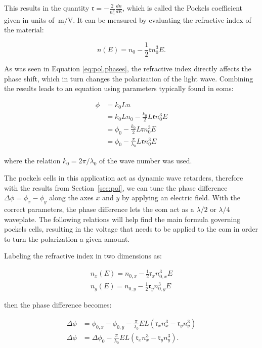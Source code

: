 This results in the quantity $\mathfrak{r} = -\frac{2}{n_0^3} \frac{dn}{dE}$, which is called the Pockels coefficient given in units of $\SI{}{\meter\per\volt}$. It can be measured by evaluating the refractive index of the material:

\begin{equation}
	n(E) = n_0 - \frac{1}{2} \mathfrak{r} n_0^3 E .
\end{equation}

As was seen in Equation \ref{eq:pol,phases}, the refractive index directly affects the phase shift, which in turn changes the polarization of the light wave. Combining the results leads to an equation using parameters typically found in \acp{eom}:

\begin{align}
	\phi & = k_0 L n \\
		 & = k_0 L n_0 - \frac{k_0}{2} L \mathfrak{r} n_0^3 E \\
		 & = \phi_0 - \frac{k_0}{2} L \mathfrak{r} n_0^3 E \\
		 & = \phi_0 - \frac{\pi}{\lambda_0} L \mathfrak{r} n_0^3 E
\end{align}

where the relation $k_0 = 2 \pi / \lambda_0$ of the wave number was used.

The pockels cells in this application act as dynamic wave retarders, therefore with the results from Section~\ref{sec:pol}, we can tune the phase difference $\Delta \phi = \phi_x - \phi_y$ along the axes $x$ and $y$ by applying an electric field. With the correct parameters, the phase difference lets the \ac{eom} act as a $\lambda / 2$ or $\lambda / 4$ waveplate. The following relations will help find the main formula governing pockels cells, resulting in the voltage that needs to be applied to the \ac{eom} in order to turn the polarization a given amount.

Labeling the refractive index in two dimensions as:

\begin{align}
	n_x(E) = n_{0,x} - \frac{1}{2} \mathfrak{r}_x n_{0,x}^3 E \\
	n_y(E) = n_{0,y} - \frac{1}{2} \mathfrak{r}_y n_{0,y}^3 E
\end{align}

then the phase difference becomes:

\begin{align}
	\Delta \phi & = \phi_{0,x} - \phi_{0,y} - \frac{\pi}{\lambda_0} E L \left(\mathfrak{r}_x n_x^3 - \mathfrak{r}_y n_y^3\right) \\
	\Delta \phi & = \Delta \phi_{0} - \frac{\pi}{\lambda_0} E L \left(\mathfrak{r}_x n_x^3 - \mathfrak{r}_y n_y^3\right) .
	\label{eq:eom_phase_diff}
\end{align}

